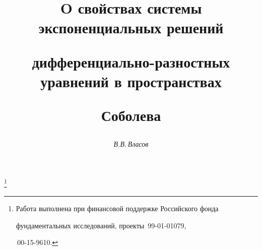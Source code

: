 

 


% 


\newcommand{\re}{\operatorname{Re}} 


\newcommand{\im}{\operatorname{Im}} 


\newcommand{\Dom}{\operatorname{Dom}} 


\newcommand{\tts}[1]{} 


 




 


\setcounter{page}{23} 












 


\author{\it В.В.\,Власов} 




\title{O свойствах системы экспоненциальных решений  


дифференциально-разностных уравнений в пространствах  


Соболева} 


\thanks{Работа выполнена при финансовой поддержке Российского фонда 


фундаментальных исследований, проекты \No\,99-01-01079, 


\No\,00-15-9610.} 


 


\date{} 




\pagestyle{plain} %


